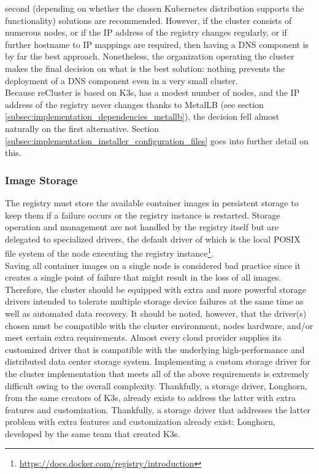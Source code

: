 second (depending on whether the chosen Kubernetes distribution supports the functionality)
solutions are recommended. However, if the cluster consists of numerous nodes, or
if the IP address of the registry changes regularly, or if further hostname to
IP mappings are required, then having a DNS component is by far the best approach.
Nonetheless, the organization operating the cluster makes the final decision on what
is the best solution: nothing prevents the deployment of a DNS component even in
a very small cluster. \\ %
Because reCluster is based on K3s, has a modest number of nodes, and the IP
address of the registry never changes thanks to MetalLB (see section \ref{subsec:implementation_dependencies_metallb}),
the decision fell almost naturally on the first alternative. Section
\ref{subsec:implementation_installer_configuration_files} goes into further
detail on this.

\subsubsection{Image Storage}
\label{subsubsec:implementation_dependencies_docker_registry_image_storage}

The registry must store the available container images in persistent storage to keep
them if a failure occurs or the registry instance is restarted. Storage
operation and management are not handled by the registry itself but are
delegated to specialized drivers, the default driver of which is the local POSIX
file system of the node executing the registry instance\footnote{\url{https://docs.docker.com/registry/introduction}}.
\\ %
Saving all container images on a single node is considered bad practice since it
creates a single point of failure that might result in the loss of all images.
Therefore, the cluster should be equipped with extra and more powerful storage drivers
intended to tolerate multiple storage device failures at the same time as well as
automated data recovery. It should be noted, however, that the driver(s) chosen must
be compatible with the cluster environment, nodes hardware, and/or meet certain extra
requirements. Almost every cloud provider supplies its customized driver that is
compatible with the underlying high-performance and distributed data center
storage system. Implementing a custom storage driver for the cluster implementation
that meets all of the above requirements is extremely difficult owing to the overall
complexity. Thankfully, a storage driver, Longhorn, from the same creators of K3s,
already exists to address the latter with extra features and customization. Thankfully,
a storage driver that addresses the latter problem with extra features and
customization already exist: Longhorn, developed by the same team that created
K3s.

